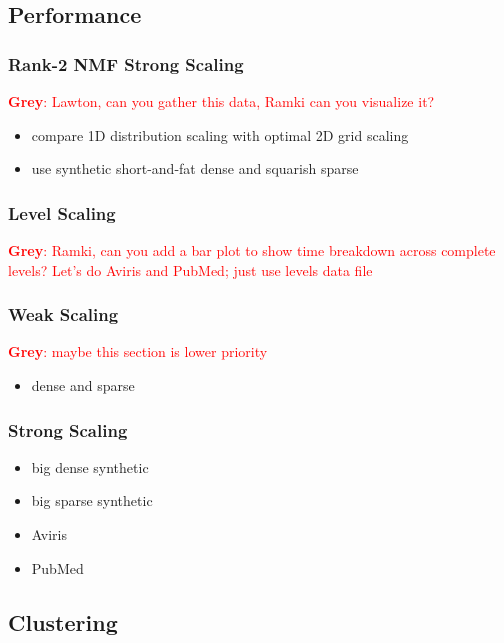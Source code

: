 \documentclass[conference,compsoc]{IEEEtran}
\newcommand{\GB}[1]{\textcolor{red}{\textbf{Grey}: #1}}
\begin{document}
\subsection{Performance}

\subsubsection{Rank-2 NMF Strong Scaling}

\GB{Lawton, can you gather this data, Ramki can you visualize it?}
\begin{itemize}
	\item compare 1D distribution scaling with optimal 2D grid scaling
	\item use synthetic short-and-fat dense and squarish sparse
\end{itemize}

\subsubsection{Level Scaling}

\GB{Ramki, can you add a bar plot to show time breakdown across complete levels?  Let's do Aviris and PubMed; just use levels data file}

\subsubsection{Weak Scaling}

\GB{maybe this section is lower priority}
\begin{itemize}
	\item dense and sparse
\end{itemize}

\subsubsection{Strong Scaling}



\begin{itemize}
	\item big dense synthetic
	\item big sparse synthetic
	\item Aviris
	\item PubMed
\end{itemize}

\subsection{Clustering}
\end{document}
